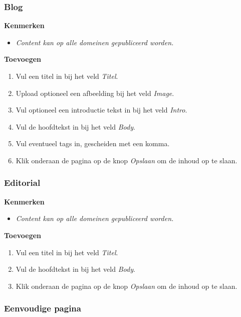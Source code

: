 \subsubsection{Blog}\label{blog}

\textbf{Kenmerken}

\begin{itemize}
\item \emph{Content kan op alle domeinen gepubliceerd worden.}
\end{itemize}

\textbf{Toevoegen}

\begin{enumerate}
\item Vul een titel in bij het veld \emph{Titel}.
\item Upload optioneel een afbeelding bij het veld \emph{Image}.
\item Vul optioneel een introductie tekst in bij het veld \emph{Intro}.
\item Vul de hoofdtekst in bij het veld \emph{Body}.
\item Vul eventueel tags in, gescheiden met een komma.
\item Klik onderaan de pagina op de knop \emph{Opslaan} om de inhoud op te slaan.
\end{enumerate}

\subsubsection{Editorial}\label{editorial}

\textbf{Kenmerken}

\begin{itemize}
\item \emph{Content kan op alle domeinen gepubliceerd worden.}
\end{itemize}

\textbf{Toevoegen}

\begin{enumerate}
\item Vul een titel in bij het veld \emph{Titel}.
\item Vul de hoofdtekst in bij het veld \emph{Body}.
\item Klik onderaan de pagina op de knop \emph{Opslaan} om de inhoud op te slaan.
\end{enumerate}

\subsubsection{Eenvoudige pagina}\label{eenvoudigepagina}

